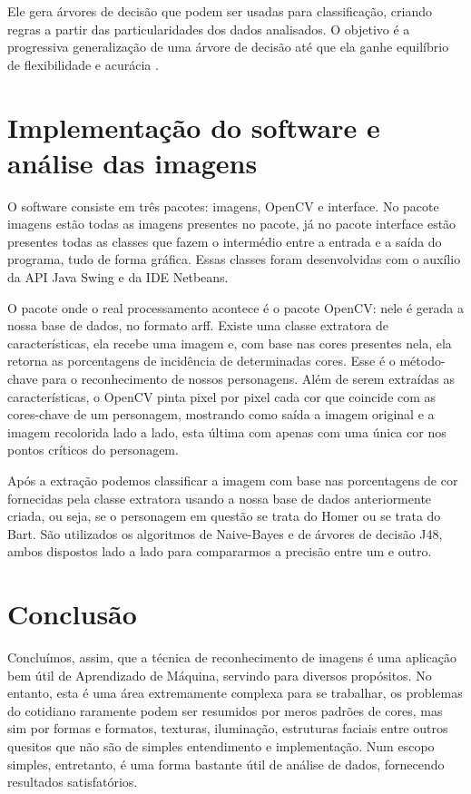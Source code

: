 \documentclass[12pt]{article}
\begin{document}
Ele gera árvores de decisão que podem ser usadas para classificação, criando regras a partir das particularidades dos dados analisados. O objetivo é a progressiva generalização de uma árvore de decisão até que ela ganhe equilíbrio de flexibilidade e acurácia \cite{J:48}.


\section{Implementação do software e análise das imagens}
O software consiste em três pacotes: imagens, OpenCV e interface. No pacote imagens estão todas as imagens presentes no pacote, já no pacote interface estão presentes todas as classes que fazem o intermédio entre a entrada e a saída do programa, tudo de forma gráfica. Essas classes foram desenvolvidas com o auxílio da API Java Swing e da IDE Netbeans.

O pacote onde o real processamento acontece é o pacote OpenCV: nele é gerada a nossa base de dados, no formato arff. Existe uma classe extratora de características, ela recebe uma imagem e, com base nas cores presentes nela, ela retorna as porcentagens de incidência de determinadas cores. Esse é o método-chave para o reconhecimento de nossos personagens. Além de serem extraídas as características, o OpenCV pinta pixel por pixel cada cor que coincide com as cores-chave de um personagem, mostrando como saída a imagem original e a imagem recolorida lado a lado, esta última com apenas com uma única cor nos pontos críticos do personagem.

Após a extração podemos classificar a imagem com base nas porcentagens de cor fornecidas pela classe extratora usando a nossa base de dados anteriormente criada, ou seja, se o personagem em questão se trata do Homer ou se trata do Bart. São utilizados os algoritmos de Naive-Bayes e de árvores de decisão J48, ambos dispostos lado a lado para compararmos a precisão entre um e outro.

\newpage
\section{Conclusão}
Concluímos, assim, que a técnica de reconhecimento de imagens é uma aplicação bem útil de Aprendizado de Máquina, servindo para diversos propósitos. No entanto, esta é uma área extremamente complexa para se trabalhar, os problemas do cotidiano raramente podem ser resumidos por meros padrões de cores, mas sim por formas e formatos, texturas, iluminação, estruturas faciais entre outros quesitos que não são de simples entendimento e implementação. Num escopo simples, entretanto, é uma forma bastante útil de análise de dados, fornecendo resultados satisfatórios.
\end{document}
